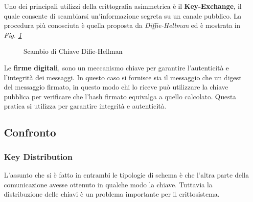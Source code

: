 \noindent
Uno dei principali utilizzi della crittografia asimmetrica è il \textbf{Key-Exchange}, il quale consente di scambiarsi un'informazione segreta su un canale pubblico. La procedura
più conosciuta è quella proposta da \textit{Diffie-Hellman} ed è mostrata in \textit{Fig. \ref{fig:dh}}

\begin{figure}[htbp]
    \centering
    \caption{Scambio di Chiave Difie-Hellman}
    \label{fig:dh}
\end{figure}

\noindent
Le \textbf{firme digitali}, sono un meccanismo chiave per garantire l'autenticità e l'integrità dei messaggi. In questo caso si fornisce sia il messaggio
che un digest del messaggio firmato, in questo modo chi lo riceve può utilizzare la chiave pubblica per verificare che l'hash firmato equivalga a quello calcolato.
Questa pratica si utilizza per garantire integrità e autenticità.
\newpage
\subsection{Confronto}

\subsubsection*{Key Distribution}

L'assunto che si è fatto in entrambi le tipologie di schema è che l'altra parte della comunicazione avesse ottenuto in qualche modo la chiave. Tuttavia la distribuzione
delle chiavi è un problema importante per il crittosistema. \\

